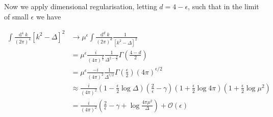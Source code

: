 \documentclass[11pt]{article}
\def\km{k_{\mu}}
\def\kn{k_{\nu}}
\renewcommand{\d}{\ensuremath{\operatorname{d}\!}}
\def\he{\frac{\epsilon}{2}}
\begin{document}
Now we apply dimensional regularisation, letting $d=4-\epsilon$, such that in the limit of small $\epsilon$ we have




\begin{align*}
\int \frac{\d^4k}{(2\pi)^4}{[ k^2-\Delta]^2} &\rightarrow  \mu^{\epsilon}\int \frac{\d^dk}{(2\pi)^d}  \frac{1}{[ k^2-\Delta]^2}\\
&= \mu^{\epsilon}\frac{i}{(4\pi)^{\frac{d}{2}}} \frac{1}{\Delta^{2-\frac{d}{2}}} \Gamma\left(\frac{4-d}{2}\right) \\
&= \mu^{\epsilon}\frac{-i}{(4\pi)^2}\frac{1}{\Delta^{\epsilon/2}}\Gamma\left(\frac{\epsilon}{2}\right) (4\pi)^{\epsilon/2}\\
&\approx \frac{i}{(4\pi)^2} \left( 1-\he\log\Delta\right)\left(\frac{2}{\epsilon}-\gamma\right)\left(1+\he\log 4\pi\right)\left(1+\he\log\mu^2\right)\\
&=\frac{i}{(4\pi)^2} \left(\frac{2}{\epsilon}-\gamma+\log\frac{4\pi\mu^2}{\Delta}\right)+\mathcal{O}(\epsilon)
\end{align*}
\end{document}
